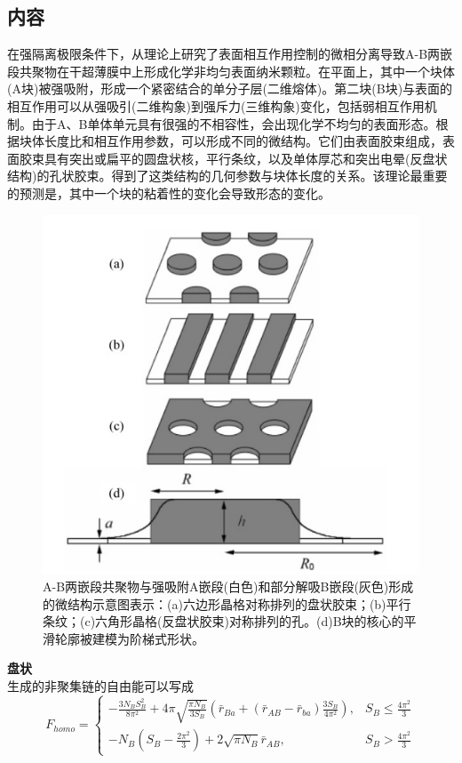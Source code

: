 \documentclass[12pt,a4paper]{article}
\numberwithin{equation}{section}
\begin{document}
\subsection{内容}
在强隔离极限条件下，从理论上研究了表面相互作用控制的微相分离导致A-B两嵌段共聚物在干超薄膜中上形成化学非均匀表面纳米颗粒。在平面上，其中一个块体(A块)被强吸附，形成一个紧密结合的单分子层(二维熔体)。第二块(B块)与表面的相互作用可以从强吸引(二维构象)到强斥力(三维构象)变化，包括弱相互作用机制。由于A、B单体单元具有很强的不相容性，会出现化学不均匀的表面形态。根据块体长度比和相互作用参数，可以形成不同的微结构。它们由表面胶束组成，表面胶束具有突出或扁平的圆盘状核，平行条纹，以及单体厚芯和突出电晕(反盘状结构)的孔状胶束。得到了这类结构的几何参数与块体长度的关系。该理论最重要的预测是，其中一个块的粘着性的变化会导致形态的变化。
\begin{figure}[H]
\centering
\includegraphics[scale=0.5]{./figures/7.png}
\caption{A-B两嵌段共聚物与强吸附A嵌段(白色)和部分解吸B嵌段(灰色)形成的微结构示意图表示：(a)六边形晶格对称排列的盘状胶束；(b)平行条纹；(c)六角形晶格(反盘状胶束)对称排列的孔。(d)B块的核心的平滑轮廓被建模为阶梯式形状。}
\end{figure}
\textbf{盘状}\\
生成的非聚集链的自由能可以写成
\begin{equation}
F_{homo} =
\begin{cases}
-\frac{3N_BS_B^2}{8\pi ^2}+4\pi\sqrt{\frac{\pi N_B}{3S_B}}\left( \bar{r}_{Ba}+(\bar{r}_{AB}-\bar{r}_{ba})\frac{3S_B}{4\pi ^2} \right), & S_B\leq\frac{4\pi^2}{3} \\
-N_B\left( S_B-\frac{2\pi ^2}{3} \right)+2\sqrt{\pi N_B}\bar{r}_{AB}, & S_B>\frac{4\pi^2}{3}
\end{cases}
\end{equation}
\end{document}
